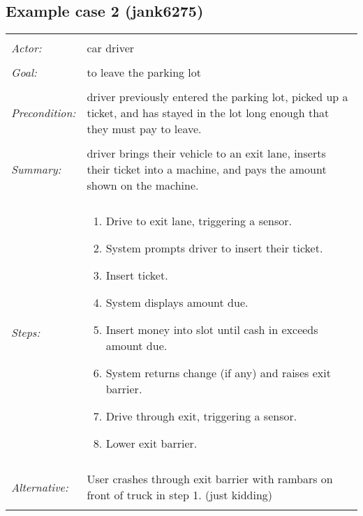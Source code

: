 \documentclass[11pt]{report}
\begin{document}
\subsection{Example case 2 (jank6275)}
\begin{tabular}{ p{2cm} p{12cm} }
 \hline
 \\
 \textit{Actor:} & car driver \\ 
 \\
 \textit{Goal:} & to leave the parking lot \\
 \\
 \textit{Precondition:} & driver previously entered the parking lot, picked up a ticket, and has stayed in the lot long enough that they must pay to leave. \\
 \\
 \textit{Summary:} & driver brings their vehicle to an exit lane, inserts their ticket into a machine, and pays the amount shown on the machine. \\ 
 \\
 \textit{Steps:} & \begin{enumerate}
  \item Drive to exit lane, triggering a sensor.
  \item System prompts driver to insert their ticket.
  \item Insert ticket.
  \item System displays amount due.
  \item Insert money into slot until cash in exceeds amount due.
  \item System returns change (if any) and raises exit barrier.
  \item Drive through exit, triggering a sensor.
  \item Lower exit barrier.
 \end{enumerate} \\
 \\
 \textit{Alternative:} & User crashes through exit barrier with rambars on front of truck in step 1. (just kidding) \\
 \\
\hline
\end{tabular}
\end{document}

